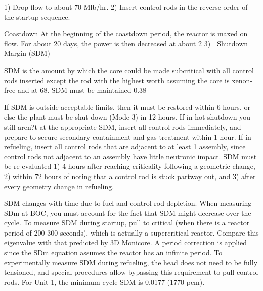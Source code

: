 \documentclass[10pt]{article}
\begin{document}
1)	Drop flow to about 70 Mlb/hr.
2)	Insert control rods in the reverse order of the startup sequence. 

Coastdown
At the beginning of the coastdown period, the reactor is maxed on flow. For about 20 days, the power is then decreased at about 2%
3)	
Shutdown Margin (SDM)

SDM is the amount by which the core could be made subcritical with all control rods inserted except the rod with the highest worth assuming the core is xenon-free and at 68. SDM must be maintained  0.38%

If SDM is outside acceptable limits, then it must be restored within 6 hours, or else the plant must be shut down (Mode 3) in 12 hours. If in hot shutdown you still aren?t at the appropriate SDM, insert all control rods immediately, and prepare to secure secondary containment and gas treatment within 1 hour. If in refueling, insert all control rods that are adjacent to at least 1 assembly, since control rods not adjacent to an assembly have little neutronic impact. SDM must be re-evaluated 1) 4 hours after reaching criticality following a geometric change, 2) within 72 hours of noting that a control rod is stuck partway out, and 3) after every geometry change in refueling. 

SDM changes with time due to fuel and control rod depletion. When measuring SDm at BOC, you must account for the fact that SDM might decrease over the cycle. To measure SDM during startup, pull to critical (when there is a reactor period of 200-300 seconds), which is actually a supercritical reactor. Compare this eigenvalue with that predicted by 3D Monicore. A period correction is applied since the SDm equation assumes the reactor has an infinite period. To experimentally measure SDM during refueling, the head does not need to be fully tensioned, and special procedures allow bypassing this requirement to pull control rods. For Unit 1, the minimum cycle SDM is 0.0177  (1770 pcm). 
\end{document}
